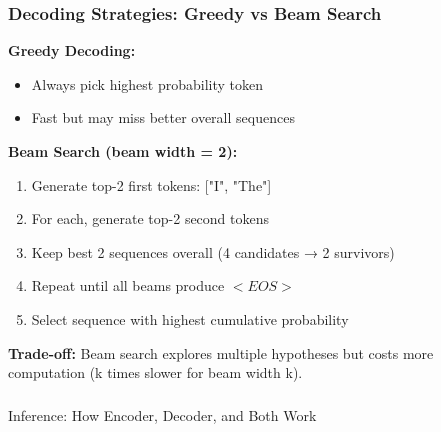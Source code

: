 \begin{frame}[fragile]\frametitle{Decoding Strategies: Greedy vs Beam Search}

\textbf{Greedy Decoding:}
\begin{itemize}
\item Always pick highest probability token
\item Fast but may miss better overall sequences
\end{itemize}

\textbf{Beam Search (beam width = 2):}
\begin{enumerate}
\item Generate top-2 first tokens: ["I", "The"]
\item For each, generate top-2 second tokens
\item Keep best 2 sequences overall (4 candidates → 2 survivors)
\item Repeat until all beams produce \texttt{$<EOS>$}
\item Select sequence with highest cumulative probability
\end{enumerate}

\textbf{Trade-off:} Beam search explores multiple hypotheses but costs more computation (k times slower for beam width k).
\end{frame}

\begin{frame}[fragile]\frametitle{}
\begin{center}
{\Large Inference: How Encoder, Decoder, and Both Work}
\end{center}
\end{frame}

